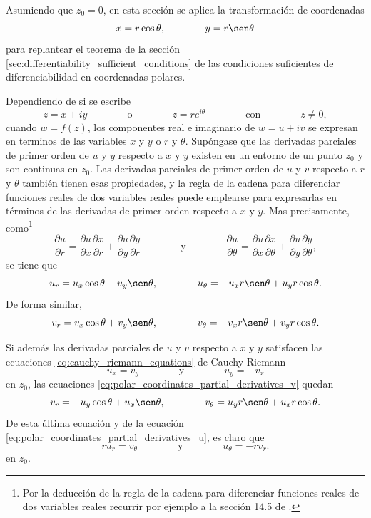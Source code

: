 \documentclass[a4paper]{report}
\begin{document}
Asumiendo que \(z_0=0\), en esta sección se aplica la transformación de coordenadas
\[
 x=r\cos\theta,\qquad\qquad y=r\sen\theta
\]
para replantear el teorema de la sección \ref{sec:differentiability_sufficient_conditions} de las condiciones suficientes de diferenciabilidad en coordenadas polares.

Dependiendo de si se escribe
\[
 z=x+iy\qquad\qquad\textrm{o}\qquad\qquad z=re^{i\theta}\qquad\qquad\textrm{con}\qquad\qquad z\neq0,
\]
cuando \(w=f(z)\), los componentes real e imaginario de \(w=u+iv\) se expresan en terminos de las variables \(x\) y \(y\) o \(r\) y \(\theta\). Supóngase que las derivadas parciales de primer orden de \(u\) y \(y\) respecto a \(x\) y \(y\) existen en un entorno de un punto \(z_0\) y son continuas en \(z_0\). Las derivadas parciales de primer orden de \(u\) y \(v\) respecto a \(r\) y \(\theta\) también tienen esas propiedades, y la regla de la cadena para diferenciar funciones reales de dos variables reales puede emplearse para expresarlas en términos de las derivadas de primer orden respecto a \(x\) y \(y\). Mas precisamente, como\footnote{Por la deducción de la regla de la cadena para diferenciar funciones reales de dos variables reales recurrir por ejemplo a la sección 14.5 de \cite{stewart2016essential}.}
\[
 \frac{\partial u}{\partial r}=\frac{\partial u}{\partial x}\frac{\partial x}{\partial r}+\frac{\partial u}{\partial y}\frac{\partial y}{\partial r}
 \qquad\qquad\textrm{y}\qquad\qquad
 \frac{\partial u}{\partial\theta}=\frac{\partial u}{\partial x}\frac{\partial x}{\partial\theta}+\frac{\partial u}{\partial y}\frac{\partial y}{\partial\theta},
\]
se tiene que 
\begin{equation}\label{eq:polar_coordinates_partial_derivatives_u}
 u_r=u_x\cos\theta+u_y\sen\theta,
 \qquad\qquad 
 u_\theta=-u_xr\sen\theta+u_yr\cos\theta.
\end{equation}
De forma similar,
\begin{equation}\label{eq:polar_coordinates_partial_derivatives_v}
 v_r=v_x\cos\theta+v_y\sen\theta,
 \qquad\qquad 
 v_\theta=-v_xr\sen\theta+v_yr\cos\theta.
\end{equation}

Si además las derivadas parciales de \(u\) y \(v\) respecto a \(x\) y \(y\) satisfacen las ecuaciones \ref{eq:cauchy_riemann_equations} de Cauchy-Riemann 
\[
 u_x=v_y
 \qquad\qquad\textrm{y}\qquad\qquad
 u_y=-v_x
\]
en \(z_0\), las ecuaciones \ref{eq:polar_coordinates_partial_derivatives_v} quedan
\[
 v_r=-u_y\cos\theta+u_x\sen\theta,
 \qquad\qquad 
 v_\theta=u_yr\sen\theta+u_xr\cos\theta.
\]
De esta última ecuación y de la ecuación \ref{eq:polar_coordinates_partial_derivatives_u}, es claro que 
\begin{equation}\label{eq:cauchy_riemann_equations_polar}
 ru_r=v_\theta 
 \qquad\qquad\textrm{y}\qquad\qquad
 u_\theta=-rv_r.
\end{equation}
en \(z_0\).
\end{document}
